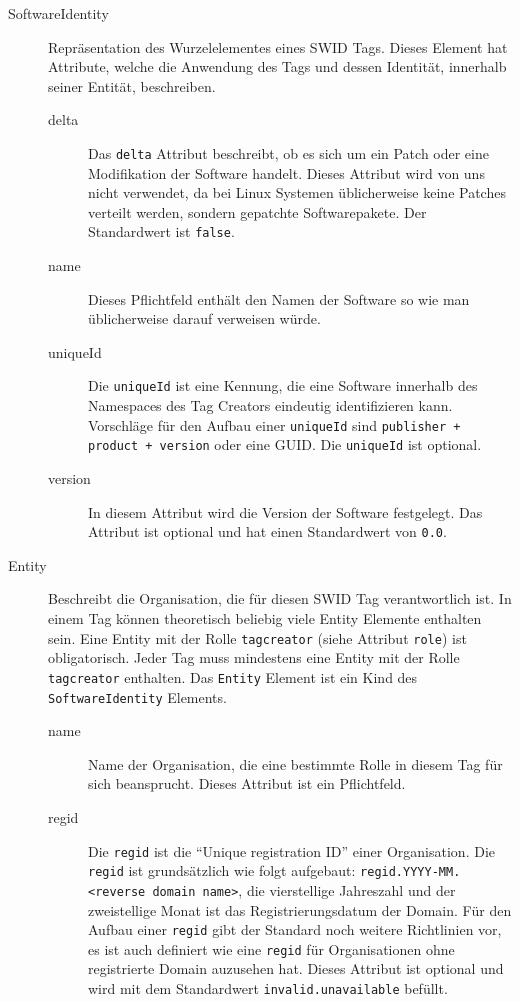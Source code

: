 \begin{description}
	\item[SoftwareIdentity] Repräsentation des Wurzelelementes eines SWID Tags.
	Dieses Element hat Attribute, welche die Anwendung des Tags und dessen Identität,
	innerhalb seiner Entität, beschreiben.
	\begin{description}
		\item[delta] Das \texttt{delta} Attribut beschreibt, ob es sich um ein Patch
		oder eine Modifikation der Software handelt. Dieses Attribut wird von uns
		nicht verwendet, da bei Linux Systemen üblicherweise keine Patches verteilt
		werden, sondern gepatchte Softwarepakete. Der Standardwert ist \texttt{false}.

		\item[name] Dieses Pflichtfeld enthält den Namen der Software so wie man
		üblicherweise darauf verweisen würde.
		
		\item[uniqueId] Die \texttt{uniqueId} ist eine Kennung, die eine Software
		innerhalb des Namespaces des Tag Creators eindeutig identifizieren kann.
		Vorschläge für den Aufbau einer \texttt{uniqueId} sind \texttt{publisher +
		product + version} oder eine GUID. Die \texttt{uniqueId} ist optional.
		
		\item[version] In diesem Attribut wird die Version der Software festgelegt.
		Das Attribut ist optional und hat einen Standardwert von \texttt{0.0}.
	\end{description}
	
	\item[Entity] Beschreibt die Organisation, die für diesen SWID Tag
	verantwortlich ist. In einem Tag können theoretisch beliebig viele Entity
	Elemente enthalten sein. Eine Entity mit der Rolle \texttt{tagcreator} (siehe
	Attribut \texttt{role}) ist obligatorisch. Jeder Tag muss mindestens eine
	Entity mit der Rolle \texttt{tagcreator} enthalten. Das \texttt{Entity} Element
	ist ein Kind des \texttt{SoftwareIdentity} Elements.
	\begin{description}
		\item[name] Name der Organisation, die eine bestimmte Rolle in diesem Tag für
		sich beansprucht. Dieses Attribut ist ein Pflichtfeld.
		
		\item[regid] Die \texttt{regid} ist die \enquote{Unique registration ID} einer
		Organisation. Die \texttt{regid} ist grundsätzlich wie folgt aufgebaut:
		\texttt{regid.YYYY-MM.<reverse domain name>}, die vierstellige Jahreszahl und
		der zweistellige Monat ist das Registrierungsdatum der Domain. Für den Aufbau
		einer \texttt{regid} gibt der Standard noch weitere Richtlinien vor, es ist
		auch definiert wie eine \texttt{regid} für Organisationen ohne registrierte
		Domain auzusehen hat. Dieses Attribut ist optional und wird mit dem
		Standardwert \texttt{invalid.unavailable} befüllt.
		

\end{description}
\end{description}
